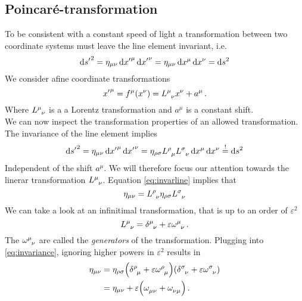 \subsection{Poincaré-transformation}
To be consistent with a constant speed of light a transformation between two
coordinate systems must leave the line element invariant, i.e.
\begin{equation}
\dif {s^\prime}^2 = \eta_{\mu\nu}\dif {x^\prime}^\mu\dif
{x^\prime}^\nu=\eta_{\mu\nu}\dif x^\mu\dif
x^\nu = \dif s^2 \label{eq:invarline}
\end{equation}
We consider afine coordinate transformations 
\begin{equation}
{x^\prime}^\mu= f^\mu(x^\nu)=\tensor{L}{^\mu_\nu}x^\nu+a^\mu\, .
\end{equation}
Where $\tensor{L}{^\mu_\nu}$ is a a Lorentz transformation and $a^\mu$ is a
constant shift.\\
We can now inspect the transformation properties of an allowed transformation.
The invariance of the line element implies
\begin{equation}
\dif {s^\prime}^2 = \eta_{\mu\nu}\dif {x^\prime}^\mu\dif
{x^\prime}^\nu=\eta_{\rho\sigma}\tensor{L}{^\rho_\mu}\tensor{L}{^\sigma_\nu}\dif
x^\mu\dif x^\nu \stackrel{!}{=} \dif s^2
\end{equation}
Independent of the shift $a^\mu$. We will therefore focus our attention towards
the linerar transformation $\tensor{L}{^\mu_\nu}$. Equation 
\eqref{eq:invarline} implies that
\begin{equation}
\eta_{\mu\nu}=\tensor{L}{^\rho_\nu}\eta_{\rho\sigma}\tensor{L}{^\sigma_\nu}\label{eq:invariance}
\end{equation}
We can take a look at an infinitimal transformation, that is up to an order of
$\varepsilon^2$
\begin{equation}
\tensor{L}{^\mu_\nu}=\tensor{\delta}{^\mu_\nu}
+\varepsilon\tensor{\omega}{^\mu_\nu}\, .
\end{equation}
The $\tensor{\omega}{^\mu_\nu}$ are called the \emph{generators} of the
transformation. Plugging into \eqref{eq:invariance}, ignoring higher powers in
$\varepsilon^2$ results in
\begin{equation}
\begin{split}
\eta_{\mu\nu}&=\eta_{\rho\sigma}\left(\tensor{\delta}{^\rho_\mu}
+\varepsilon\tensor{\omega}{^\rho_\mu}\right)\left(\tensor{\delta}{^\sigma_\nu}
+\varepsilon\tensor{\omega}{^\sigma_\nu}\right)\\
&=
\eta_{\mu\nu}+\varepsilon\left(\tensor{\omega}{_\mu_\nu}+\tensor{\omega}{_\nu_\mu}\right)\,
.
\end{split}
\end{equation}
